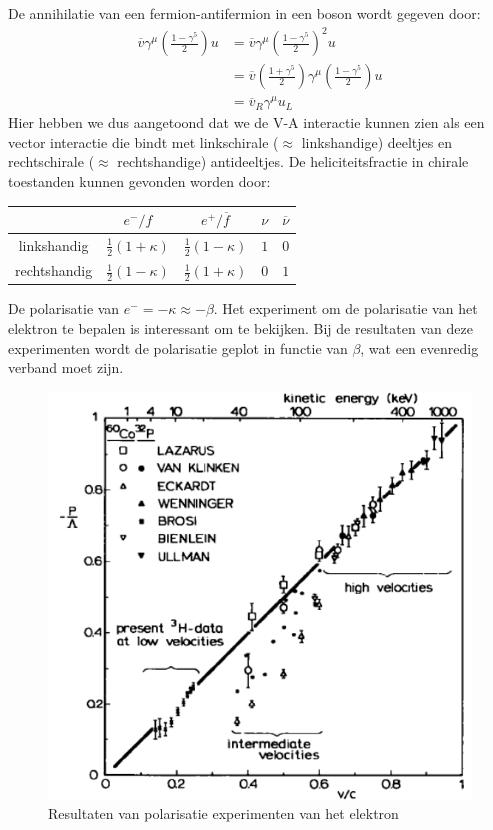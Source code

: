 \documentclass[../main.tex]{subfiles}
\begin{document}
De annihilatie van een fermion-antifermion in een boson wordt gegeven door:
\begin{equation}
    \begin{aligned}
        \label{eq:fermion_annihilatie}
        \overline v \gamma^\mu \left( \frac{1-\gamma^5}{2} \right) u &= \overline v \gamma^\mu \left( \frac{1-\gamma^5}{2} \right)^2 u\\
                                                                     &= \overline v \left( \frac{1+\gamma^5}{2} \right) \gamma^\mu \left( \frac{1-\gamma^5}{2} \right) u\\
                                                                     &= \overline v_R \gamma^\mu u_L
    \end{aligned}
\end{equation}
Hier hebben we dus aangetoond dat we de V-A interactie kunnen zien als een vector interactie die bindt met linkschirale ($\approx$ linkshandige) deeltjes en rechtschirale ($\approx$ rechtshandige) antideeltjes. De heliciteitsfractie in chirale toestanden kunnen gevonden worden door:

\begin{table}[h]
    \centering
    \label{tab:chir_hel}
    \begin{tabular}{c|cccc}
                        & $e^-/f$                   & $e^+/\overline f$         & $\nu$ & $\overline \nu$   \\
        \hline
        linkshandig    & $\frac{1}{2}(1+\kappa)$   & $\frac{1}{2}(1-\kappa)$   & $1$   & $0$               \\
        rechtshandig   & $\frac{1}{2}(1-\kappa)$   & $\frac{1}{2}(1+\kappa)$   & $0$   & $1$               
    \end{tabular}
\end{table}
De polarisatie van $e^- = -\kappa \approx -\beta$. Het experiment om de polarisatie van het elektron te bepalen is interessant om te bekijken. Bij de resultaten van deze experimenten wordt de polarisatie geplot in functie van $\beta$, wat een evenredig verband moet zijn. 

\begin{figure}[h]
    \centering
    \includegraphics[width=0.5\linewidth]{parity_violation/pol_elektron.png}
    \caption{Resultaten van polarisatie experimenten van het elektron}%
    \label{fig:parity_violation/pol_elektron}
\end{figure}
\end{document}
